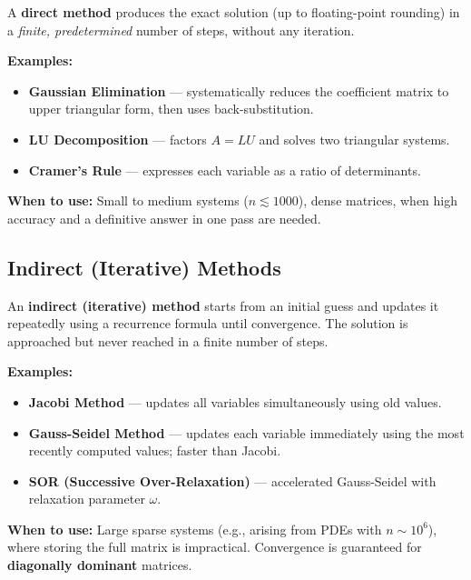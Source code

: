 \documentclass[12pt]{article}
\begin{document}
\begin{conceptbox}
A \textbf{direct method} produces the exact solution (up to floating-point rounding) in a \emph{finite, predetermined} number of steps, without any iteration.
\end{conceptbox}

\textbf{Examples:}
\begin{itemize}[noitemsep]
  \item \textbf{Gaussian Elimination} --- systematically reduces the coefficient matrix to upper triangular form, then uses back-substitution.
  \item \textbf{LU Decomposition} --- factors $A = LU$ and solves two triangular systems.
  \item \textbf{Cramer's Rule} --- expresses each variable as a ratio of determinants.
\end{itemize}

\textbf{When to use:} Small to medium systems ($n \lesssim 1000$), dense matrices, when high accuracy and a definitive answer in one pass are needed.

\vspace{10pt}
\subsection*{Indirect (Iterative) Methods}

\begin{conceptbox}
An \textbf{indirect (iterative) method} starts from an initial guess and updates it repeatedly using a recurrence formula until convergence. The solution is approached but never reached in a finite number of steps.
\end{conceptbox}

\textbf{Examples:}
\begin{itemize}[noitemsep]
  \item \textbf{Jacobi Method} --- updates all variables simultaneously using old values.
  \item \textbf{Gauss-Seidel Method} --- updates each variable immediately using the most recently computed values; faster than Jacobi.
  \item \textbf{SOR (Successive Over-Relaxation)} --- accelerated Gauss-Seidel with relaxation parameter $\omega$.
\end{itemize}

\textbf{When to use:} Large sparse systems (e.g., arising from PDEs with $n \sim 10^6$), where storing the full matrix is impractical. Convergence is guaranteed for \textbf{diagonally dominant} matrices.
\end{document}
